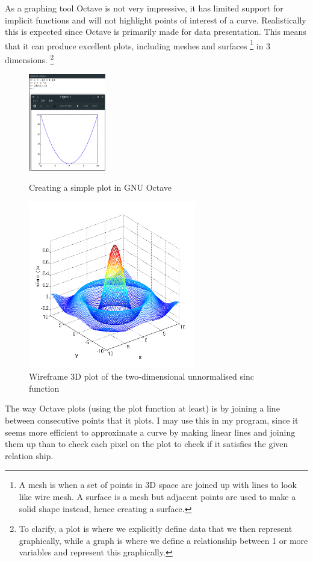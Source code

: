 \documentclass[../../../main.tex]{subfiles}
\begin{document}
As a graphing tool Octave is not very impressive, it has limited support for implicit functions and will not highlight points of interest of a curve. Realistically this is expected since Octave is primarily made for data presentation. This means that it can produce excellent plots, including meshes and surfaces
\footnote{A mesh is when a set of points in 3D space are joined up with lines to look like wire mesh. A surface is a mesh but adjacent points are used to make a solid shape instead, hence creating a surface.}
 in 3 dimensions.
\footnote{To clarify, a plot is where we explicitly define data that we then represent graphically, while a graph is where we define a relationship between 1 or more variables and represent this graphically.}
\begin{figure}[H]
\centering
\begin{minipage}{.7\textwidth}
	\centering
  	\includegraphics[width=0.3\textwidth]{images/octavePlot}
	\caption{Creating a simple plot in GNU Octave}
	\label{fig:octavePlot}
\end{minipage}%
\begin{minipage}{.3\textwidth}
	\centering
	\includegraphics[width=0.65\textwidth]{images/matlabMesh}
	\caption{Wireframe 3D plot of the two-dimensional unnormalised sinc function}
\end{minipage}
\end{figure}
The way Octave plots (using the plot function at least) is by joining a line between consecutive points that it plots. I may use this in my program, since it seems more efficient to approximate a curve by making linear lines and joining them up than to check each pixel on the plot to check if it satisfies the given relation ship.
\end{document}
